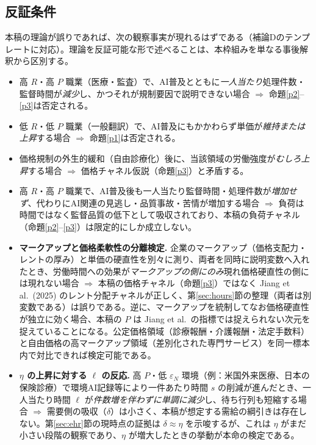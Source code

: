 \documentclass[11pt]{article}
\theoremstyle{plain}
\theoremstyle{definition}
\theoremstyle{remark}
\begin{document}
\subsection{反証条件}\label{sec:falsify}
本稿の理論が誤りであれば、次の観察事実が現れるはずである（補論Dのテンプレートに対応）。理論を反証可能な形で述べることは、本枠組みを単なる事後解釈から区別する。
\begin{itemize}[leftmargin=1.4em,itemsep=2pt]
\item 高 $R$・高 $P$ 職業（医療・監査）で、AI普及とともに\emph{一人当たり}処理件数・監督時間が\emph{減少}し、かつそれが規制要因で説明できない場合 $\Rightarrow$ 命題\ref{p2}--\ref{p3}は否定される。
\item 低 $R$・低 $P$ 職業（一般翻訳）で、AI普及にもかかわらず単価が\emph{維持または上昇}する場合 $\Rightarrow$ 命題\ref{p1}は否定される。
\item 価格規制の外生的緩和（自由診療化）後に、当該領域の労働強度が\emph{むしろ上昇}する場合 $\Rightarrow$ 価格チャネル仮説（命題\ref{p3}）と矛盾する。
\item 高 $R$・高 $P$ 職業で、AI普及後も一人当たり監督時間・処理件数が\emph{増加せず}、代わりにAI関連の見逃し・品質事故・苦情が増加する場合 $\Rightarrow$ 負荷は時間ではなく監督品質の低下として吸収されており、本稿の負荷チャネル（命題\ref{p2}--\ref{p3}）は限定的にしか成立しない。
\item \textbf{マークアップと価格柔軟性の分離検定.} 企業のマークアップ（価格支配力・レントの厚み）と単価の硬直性を別々に測り、両者を同時に説明変数へ入れたとき、労働時間への効果が\emph{マークアップの側にのみ}現れ価格硬直性の側には現れない場合 $\Rightarrow$ 本稿の価格チャネル（命題\ref{p3}）ではなく Jiang et al.\ (2025) のレント分配チャネルが正しく、第\ref{sec:hours}節の整理（両者は別変数である）は誤りである。逆に、マークアップを統制してなお価格硬直性が独立に効く場合、本稿の $P$ は Jiang et al.\ の指標では捉えられない次元を捉えていることになる。公定価格領域（診療報酬・介護報酬・法定手数料）と自由価格の高マークアップ領域（差別化された専門サービス）を同一標本内で対比できれば検定可能である。
\item \textbf{$\eta$ の上昇に対する $\ell$ の反応.} 高 $P$・低 $\varepsilon_N$ 環境（例：米国外来医療、日本の保険診療）で環境AI記録等により一件あたり時間 $s$ の削減が進んだとき、一人当たり時間 $\ell$ が\emph{件数増を伴わずに単調に減少}し、待ち行列も短縮する場合 $\Rightarrow$ 需要側の吸収（$\delta$）は小さく、本稿が想定する需給の綱引きは存在しない。第\ref{sec:ehr}節の現時点の証拠は $\delta\approx\eta$ を示唆するが、これは $\eta$ がまだ小さい段階の観察であり、$\eta$ が増大したときの挙動が本命の検定である。
\end{itemize}
\end{document}
